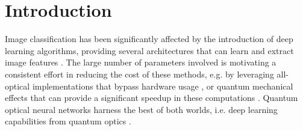 \documentclass[reprint,
superscriptaddress,
nofootinbib,
aps,
pra,
showkeys
]{revtex4-2}
\begin{document}
\section{Introduction}
Image classification has been significantly affected by the introduction of deep learning algorithms, providing several architectures that can learn and extract image features \citep{art:LeNet,art:AlexNet,art:ResNet,art:ViT}. The large number of parameters involved is motivating a consistent effort in reducing the cost of these methods, e.g. by leveraging all-optical implementations that bypass hardware usage \citep{art:Shastri,art:Lin,art:Zuo,art:Colburn,art:Li,art:Luo,art:McMahon}, or quantum mechanical effects that can provide a significant speedup in these computations \citep{art:Mangini,art:Tacchino,art:Cerezo1,art:Senokosov, art:Cerezo2}. Quantum optical neural networks harness the best of both worlds, i.e. deep learning capabilities from quantum optics \citep{art:Steinbrecher,art:Killoran,art:Sui,art:Stanev,art:Wood}.
\end{document}
